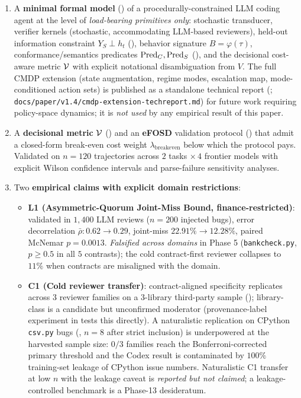 \begin{enumerate}[leftmargin=2em]
\item A \textbf{minimal formal model} () of a procedurally-constrained LLM coding agent at the level of \emph{load-bearing primitives only}: stochastic transducer, verifier kernels (stochastic, accommodating LLM-based reviewers), held-out information constraint $Y_S \perp h_t$ (), behavior signature $B = \varphi(\tau)$, conformance/semantics predicates $\mathrm{Pred}_C, \mathrm{Pred}_S$ (), and the decisional cost-aware metric $\mathcal{V}$ with explicit notational disambiguation from $V$. The full CMDP extension (state augmentation, regime modes, escalation map, mode-conditioned action sets) is published as a standalone technical report (; \texttt{docs/paper/v1.4/cmdp-extension-techreport.md}) for future work requiring policy-space dynamics; it is \emph{not used} by any empirical result of this paper.

\item A \textbf{decisional metric} $\mathcal{V}$ () and an \textbf{eFOSD} validation protocol () that admit a closed-form break-even cost weight $\lambda_{\mathrm{breakeven}}$ below which the protocol pays. Validated on $n=120$ trajectories across $2$ tasks $\times\,4$ frontier models with explicit Wilson confidence intervals and parse-failure sensitivity analyses.

\item Two \textbf{empirical claims with explicit domain restrictions}:
  \begin{itemize}
    \item \textbf{L1 (Asymmetric-Quorum Joint-Miss Bound, finance-restricted)}: validated in $1{,}400$ LLM reviews ($n = 200$ injected bugs), error decorrelation $\bar{\rho}\!: 0.62 \to 0.29$, joint-miss $22.91\% \to 12.28\%$, paired McNemar $p = 0.0013$. \emph{Falsified across domains} in Phase 5 (\texttt{bankcheck.py}, $p \ge 0.5$ in all $5$ contrasts); the cold contract-first reviewer collapses to $11\%$ when contracts are misaligned with the domain.
    \item \textbf{C1 (Cold reviewer transfer)}: contract-aligned specificity replicates across $3$ reviewer families on a $3$-library third-party sample (); library-class is a candidate but unconfirmed moderator (provenance-label experiment in  tests this directly). A naturalistic replication on CPython \texttt{csv.py} bugs (, $n = 8$ after strict inclusion) is underpowered at the harvested sample size: $0/3$ families reach the Bonferroni-corrected primary threshold and the Codex result is contaminated by $100\%$ training-set leakage of CPython issue numbers. Naturalistic C1 transfer at low $n$ with the leakage caveat is \emph{reported but not claimed}; a leakage-controlled benchmark is a Phase-13 desideratum.
  \end{itemize}


\end{enumerate}
